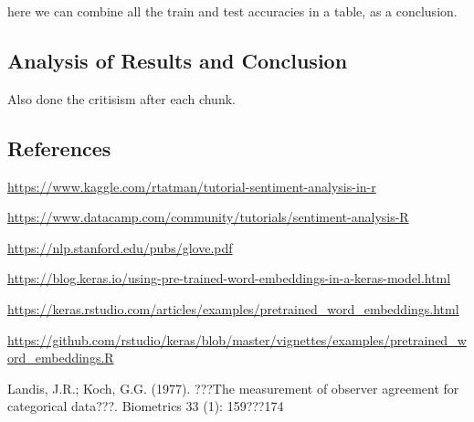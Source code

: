 \documentclass[]{article}
\begin{document}
here we can combine all the train and test accuracies in a table, as a
conclusion.

\hypertarget{analysis-of-results-and-conclusion}{%
\subsection{\texorpdfstring{\textbf{Analysis of Results and
Conclusion}}{Analysis of Results and Conclusion}}\label{analysis-of-results-and-conclusion}}

Also done the critisism after each chunk.

\hypertarget{references}{%
\subsection{\texorpdfstring{\textbf{References}}{References}}\label{references}}

\url{https://www.kaggle.com/rtatman/tutorial-sentiment-analysis-in-r}

\url{https://www.datacamp.com/community/tutorials/sentiment-analysis-R}

\url{https://nlp.stanford.edu/pubs/glove.pdf}

\url{https://blog.keras.io/using-pre-trained-word-embeddings-in-a-keras-model.html}

\url{https://keras.rstudio.com/articles/examples/pretrained_word_embeddings.html}

\url{https://github.com/rstudio/keras/blob/master/vignettes/examples/pretrained_word_embeddings.R}

Landis, J.R.; Koch, G.G. (1977). ???The measurement of observer
agreement for categorical data???. Biometrics 33 (1): 159???174
\end{document}
